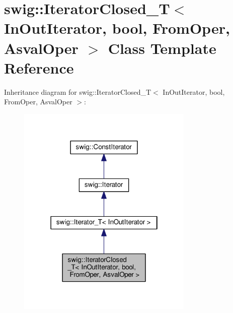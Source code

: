 \hypertarget{classswig_1_1IteratorClosed__T_3_01InOutIterator_00_01bool_00_01FromOper_00_01AsvalOper_01_4}{}\section{swig\+:\+:Iterator\+Closed\+\_\+T$<$ In\+Out\+Iterator, bool, From\+Oper, Asval\+Oper $>$ Class Template Reference}
\label{classswig_1_1IteratorClosed__T_3_01InOutIterator_00_01bool_00_01FromOper_00_01AsvalOper_01_4}


Inheritance diagram for swig\+:\+:Iterator\+Closed\+\_\+T$<$ In\+Out\+Iterator, bool, From\+Oper, Asval\+Oper $>$\+:
\nopagebreak
\begin{figure}[H]
\begin{center}
\leavevmode
\includegraphics[width=238pt]{classswig_1_1IteratorClosed__T_3_01InOutIterator_00_01bool_00_01FromOper_00_01AsvalOper_01_4__inherit__graph}
\end{center}
\end{figure}


